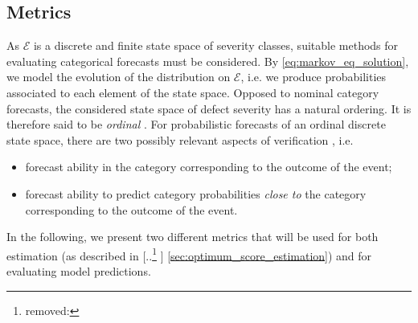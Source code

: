 \documentclass{article}
\providecommand{\DIFadd}[1]{{\protect\color{blue} \sf #1}} %
\providecommand{\DIFdel}[1]{{\protect\color{red} [..\footnote{removed: #1} ]}} %
\providecommand{\DIFaddbegin}{} %
\providecommand{\DIFaddend}{} %
\providecommand{\DIFdelbegin}{} %
\providecommand{\DIFdelend}{} %
\begin{document}
\subsection{Metrics} \label{sec:error_metrics}
As $\mathcal{E}$ is a discrete and finite state space of severity classes, suitable methods for evaluating categorical forecasts must be considered. By \cref{eq:markov_eq_solution}, we model the evolution of the distribution on $\mathcal{E}$, i.e. we produce probabilities associated to each element of the state space.
Opposed to nominal category forecasts, the considered state space of defect severity has a natural ordering. It is therefore said to be \textit{ordinal} \citep{broecker2008a,hamill1997}.
For probabilistic forecasts of an ordinal discrete state space, there are two possibly relevant aspects of verification \citep{Weijs2010}, i.e. 
\begin{itemize}
\item forecast ability in the category corresponding to the outcome of the event;
\item forecast ability to predict category probabilities \textit{close to} the category corresponding to the outcome of the event.
\end{itemize} 
In the following, we present two different metrics that will be used for both estimation (as described in \DIFdelbegin \DIFdel{}\DIFdelend \DIFaddbegin \DIFadd{\cref{sec:optimum_score_estimation}}\DIFaddend ) and for evaluating model predictions.

\end{document}
